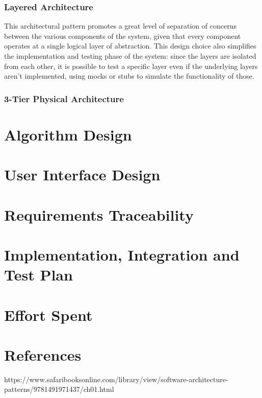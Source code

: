 \documentclass[12pt]{article}
\begin{document}
\subsubsection{Layered Architecture} This architectural pattern promotes a great level of separation of concerns between the various components of the system, given that every component operates at a single logical layer of abstraction. This design choice also simplifies the implementation and testing phase of the system: since the layers are isolated from each other, it is possible to test a specific layer even if the underlying layers aren't implemented, using mocks or stubs to simulate the functionality of those.
\subsubsection{3-Tier Physical Architecture}

\section{Algorithm Design}

\section{User Interface Design}

\section{Requirements Traceability}

\section{Implementation, Integration and Test Plan}

\section{Effort Spent}

\section{References}
https://www.safaribooksonline.com/library/view/software-architecture-patterns/9781491971437/ch01.html
\end{document}
